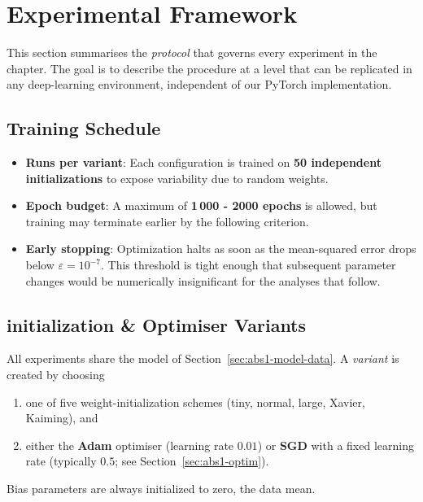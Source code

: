 ﻿%
\section{Experimental Framework}
\label{sec:abs1-framework}

This section summarises the \emph{protocol} that governs every experiment in the chapter.  The goal is to describe the procedure at a level that can be replicated in any deep-learning environment, independent of our PyTorch implementation.

\subsection*{Training Schedule}

\begin{itemize}
  \item \textbf{Runs per variant}: Each configuration is trained on \textbf{50 independent initializations} to expose variability due to random weights. \item \textbf{Epoch budget}: A maximum of \textbf{1\,000 - 2000 epochs} is allowed, but training may terminate earlier by the following criterion.
  \item \textbf{Early stopping}: Optimization halts as soon as the mean-squared error drops below \(\displaystyle\varepsilon = 10^{-7}\). This threshold is tight enough that subsequent parameter changes would be numerically insignificant for the analyses that follow.
\end{itemize}

\subsection*{initialization \& Optimiser Variants}

All experiments share the model of Section~\ref{sec:abs1-model-data}.  A \emph{variant} is created by choosing

\begin{enumerate}
  \item one of five weight-initialization schemes (tiny, normal, large, Xavier, Kaiming), and
  \item either the \textbf{Adam} optimiser (learning rate \(0.01\)) or \textbf{SGD} with a fixed learning rate (typically \(0.5\); see Section~\ref{sec:abs1-optim}).
\end{enumerate}

Bias parameters are always initialized to zero, the data mean.

